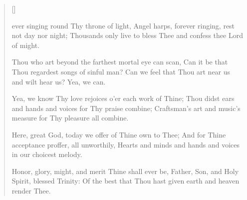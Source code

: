 \newHymn
{}

\begin{verse}[\versewidth]
\begin{indentedVerse}
 ever singing
\vin round Thy throne of light,
Angel harps, forever ringing,
\vin rest not day nor night;
Thousands only live to bless Thee
\vin and confess thee Lord of might.
\end{indentedVerse}

\begin{indentedVerse}
Thou who art beyond the farthest
\vin mortal eye can scan,
Can it be that Thou regardest
\vin songs of sinful man?
Can we feel that Thou art near us
\vin and wilt hear us? Yea, we can.
\end{indentedVerse}

\begin{indentedVerse}
Yea, we know Thy love rejoices
\vin o'er each work of Thine;
Thou didst ears and hands and voices
\vin for Thy praise combine;
Craftsman's art and music's measure
\vin for Thy pleasure all combine.
\end{indentedVerse}

\begin{indentedVerse}
Here, great God, today we offer
\vin of Thine own to Thee;
And for Thine acceptance proffer,
\vin all unworthily,
Hearts and minds and hands and voices
\vin in our choicest melody.
\end{indentedVerse}

\begin{indentedVerse}
Honor, glory, might, and merit
\vin Thine shall ever be,
Father, Son, and Holy Spirit,
\vin blessed Trinity:
Of the best that Thou hast given
\vin earth and heaven render Thee.
\end{indentedVerse}

\end{verse}



